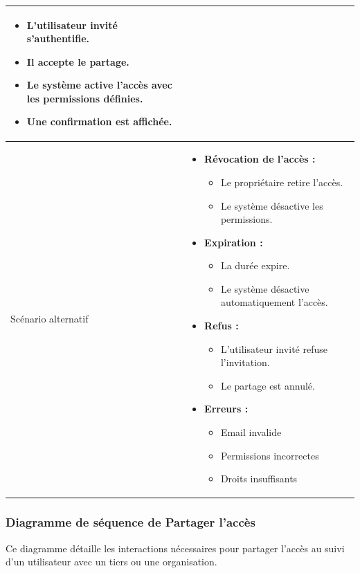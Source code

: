 \begin{longtable}{|p{}|>{\raggedright\arraybackslash}p{}|}
\begin{itemize}
\item L’utilisateur invité s’authentifie.
\item Il accepte le partage.

\item Le système active l’accès avec les permissions définies.

\item Une confirmation est affichée.
\end{itemize}
\\ \hline

Scénario alternatif &
\begin{itemize}

\item \textbf{Révocation de l’accès :}
\begin{itemize}
\item Le propriétaire retire l’accès.
\item Le système désactive les permissions.
\end{itemize}

\item \textbf{Expiration :}
\begin{itemize}
\item La durée expire.
\item Le système désactive automatiquement l’accès.
\end{itemize}

\item \textbf{Refus :}
\begin{itemize}
\item L’utilisateur invité refuse l’invitation.
\item Le partage est annulé.
\end{itemize}

\item \textbf{Erreurs :}
\begin{itemize}
\item Email invalide
\item Permissions incorrectes
\item Droits insuffisants
\end{itemize}

\end{itemize}
\\ \hline

\end{longtable}
\subsubsection{Diagramme de séquence de \og Partager l'accès \fg}
Ce diagramme détaille les interactions nécessaires pour partager l'accès au suivi d'un utilisateur avec un tiers ou une organisation.

